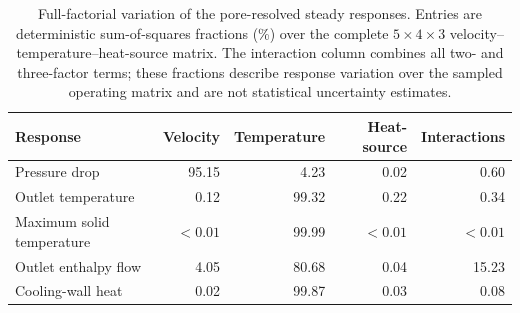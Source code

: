 \begin{table}[htbp]
\centering
\caption{Full-factorial variation of the pore-resolved steady responses. Entries are deterministic sum-of-squares fractions (\%) over the complete $5\times4\times3$ velocity--temperature--heat-source matrix. The interaction column combines all two- and three-factor terms; these fractions describe response variation over the sampled operating matrix and are not statistical uncertainty estimates.}
\label{tab:steady_factorial_effects}
\footnotesize
\begin{tabular*}{\textwidth}{@{\extracolsep{\fill}}lrrrr@{}}
\toprule
Response & Velocity & Temperature & Heat-source & Interactions \\
\midrule
Pressure drop & 95.15 & 4.23 & 0.02 & 0.60 \\
Outlet temperature & 0.12 & 99.32 & 0.22 & 0.34 \\
Maximum solid temperature & $<0.01$ & 99.99 & $<0.01$ & $<0.01$ \\
Outlet enthalpy flow & 4.05 & 80.68 & 0.04 & 15.23 \\
Cooling-wall heat & 0.02 & 99.87 & 0.03 & 0.08 \\
\bottomrule
\end{tabular*}
\end{table}
